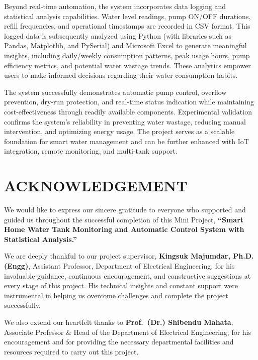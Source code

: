 \documentclass[12pt,a4paper]{article}
\begin{document}
Beyond real-time automation, the system incorporates data logging and statistical analysis capabilities. Water level readings, pump ON/OFF durations, refill frequencies, and operational timestamps are recorded in CSV format. This logged data is subsequently analyzed using Python (with libraries such as Pandas, Matplotlib, and PySerial) and Microsoft Excel to generate meaningful insights, including daily/weekly consumption patterns, peak usage hours, pump efficiency metrics, and potential water wastage trends. These analytics empower users to make informed decisions regarding their water consumption habits.

The system successfully demonstrates automatic pump control, overflow prevention, dry-run protection, and real-time status indication while maintaining cost-effectiveness through readily available components. Experimental validation confirms the system's reliability in preventing water wastage, reducing manual intervention, and optimizing energy usage. The project serves as a scalable foundation for smart water management and can be further enhanced with IoT integration, remote monitoring, and multi-tank support.

\newpage

\clearpage
\section*{ACKNOWLEDGEMENT}

We would like to express our sincere gratitude to everyone who supported and guided us throughout the successful completion of this Mini Project, \textbf{``Smart Home Water Tank Monitoring and Automatic Control System with Statistical Analysis.''}

We are deeply thankful to our project supervisor, \textbf{Kingsuk Majumdar, Ph.D.(Engg)}, Assistant Professor, Department of Electrical Engineering, for his invaluable guidance, continuous encouragement, and constructive suggestions at every stage of this project. His technical insights and constant support were instrumental in helping us overcome challenges and complete the project successfully.

We also extend our heartfelt thanks to \textbf{Prof.\ (Dr.) Shibendu Mahata}, Associate Professor \& Head of the Department of Electrical Engineering, for his encouragement and for providing the necessary departmental facilities and resources required to carry out this project.
\end{document}
